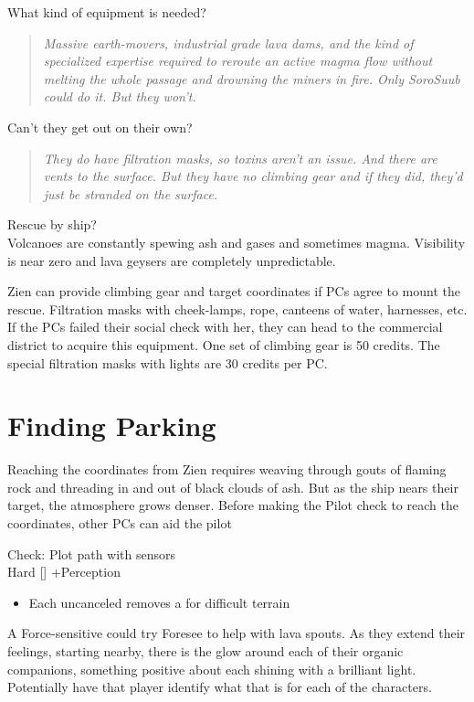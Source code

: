 \documentclass{book}
\newcommand{\df}{\difficulty}
\begin{document}
\begin{multicols}{2}
What kind of equipment is needed? \\
\begin{quote}
\emph{
Massive earth-movers, industrial grade lava dams, and the kind of specialized expertise required to reroute an active magma flow without melting the whole passage and drowning the miners in fire. Only SoroSuub could do it. But they won’t.}
\end{quote}

Can't they get out on their own?  \\
\begin{quote}
\emph{
They do have filtration masks, so toxins aren’t an issue. And there are vents to the surface. But they have no climbing gear and if they did, they’d just be stranded on the surface.}
\end{quote}

Rescue by ship? \\
Volcanoes are constantly spewing ash and gases and sometimes magma. Visibility is near zero and lava geysers are completely unpredictable. 

Zien can provide climbing gear and target coordinates if PCs agree to mount the rescue. Filtration masks with cheek-lamps, rope, canteens of water, harnesses, etc. If the PCs failed their social check with her, they can head to the commercial district to acquire this equipment. One set of climbing gear is 50 credits. The special filtration masks with lights are 30 credits per PC.


\section{Finding Parking}

Reaching the coordinates from Zien requires weaving through gouts of flaming rock and threading in and out of black clouds of ash. But as the ship nears their target, the atmosphere grows denser. Before making the Pilot check to reach the coordinates, other PCs can aid the pilot

Check: Plot path with sensors\\
Hard [\df\df\df] +\setback  Perception 
\begin{itemize}
\item \success Each uncanceled \success removes a \setback for difficult terrain
\end{itemize}

A Force-sensitive could try Foresee to help with lava spouts. As they extend their feelings, starting nearby, there is the glow around each of their organic companions, something positive about each shining with a brilliant light. Potentially have that player identify what that is for each of the characters.


\end{multicols}
\end{document}
